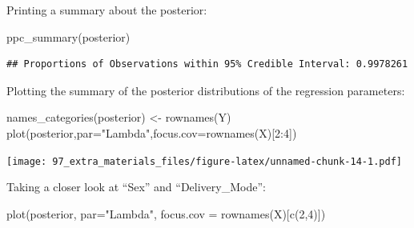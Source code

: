 \documentclass[
]{book}
\newenvironment{Shaded}{\begin{snugshade}}{\end{snugshade}}
\newcommand{\AttributeTok}[1]{\textcolor[rgb]{0.77,0.63,0.00}{#1}}
\newcommand{\CommentTok}[1]{\textcolor[rgb]{0.56,0.35,0.01}{\textit{#1}}}
\newcommand{\DecValTok}[1]{\textcolor[rgb]{0.00,0.00,0.81}{#1}}
\newcommand{\FloatTok}[1]{\textcolor[rgb]{0.00,0.00,0.81}{#1}}
\newcommand{\FunctionTok}[1]{\textcolor[rgb]{0.00,0.00,0.00}{#1}}
\newcommand{\NormalTok}[1]{#1}
\newcommand{\OtherTok}[1]{\textcolor[rgb]{0.56,0.35,0.01}{#1}}
\newcommand{\SpecialCharTok}[1]{\textcolor[rgb]{0.00,0.00,0.00}{#1}}
\newcommand{\StringTok}[1]{\textcolor[rgb]{0.31,0.60,0.02}{#1}}
\begin{document}
\begin{Shaded}
\end{Shaded}

Printing a summary about the posterior:

\begin{Shaded}
\begin{Highlighting}[]
\FunctionTok{ppc\_summary}\NormalTok{(posterior)}
\end{Highlighting}
\end{Shaded}

\begin{verbatim}
## Proportions of Observations within 95% Credible Interval: 0.9978261
\end{verbatim}

Plotting the summary of the posterior distributions of the regression parameters:

\begin{Shaded}
\begin{Highlighting}[]
\FunctionTok{names\_categories}\NormalTok{(posterior) }\OtherTok{\textless{}{-}} \FunctionTok{rownames}\NormalTok{(Y)}
\FunctionTok{plot}\NormalTok{(posterior,}\AttributeTok{par=}\StringTok{"Lambda"}\NormalTok{,}\AttributeTok{focus.cov=}\FunctionTok{rownames}\NormalTok{(X)[}\DecValTok{2}\SpecialCharTok{:}\DecValTok{4}\NormalTok{])}
\end{Highlighting}
\end{Shaded}

\texttt{[image: 97\_extra\_materials\_files/figure-latex/unnamed-chunk-14-1.pdf]}

Taking a closer look at ``Sex'' and ``Delivery\_Mode'':

\begin{Shaded}
\begin{Highlighting}[]
\FunctionTok{plot}\NormalTok{(posterior, }\AttributeTok{par=}\StringTok{"Lambda"}\NormalTok{, }\AttributeTok{focus.cov =} \FunctionTok{rownames}\NormalTok{(X)[}\FunctionTok{c}\NormalTok{(}\DecValTok{2}\NormalTok{,}\DecValTok{4}\NormalTok{)])}
\end{Highlighting}
\end{Shaded}
\end{document}
